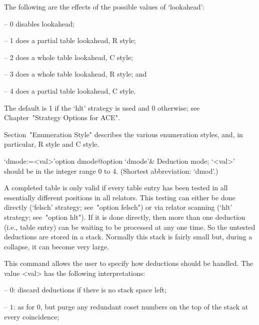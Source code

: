 The following are the effects of the possible values of `lookahead':

\beginlist

\item{--} 0 disables lookahead;
\item{--} 1 does a partial table lookahead, R style; 
\item{--} 2 does a whole table lookahead, C style; 
\item{--} 3 does a whole table lookahead, R style; and
\item{--} 4 does a partial table lookahead, C style.  

\endlist

The default is 1 if the `hlt' strategy is used and  0  otherwise;  see
Chapter~"Strategy Options for ACE".

Section~"Enumeration Style" describes the various enumeration  styles,
and, in particular, R style and C style.

\enditems


\beginitems

\>`dmode:=<val>'{option dmode}@{option `dmode'}&
Deduction mode; `<val>' should be in the integer range 0 to 4.
(Shortest abbreviation: `dmod'.)

A completed table  is only valid if every table  entry has been tested
in all essentially different  positions in all relators.  This testing
can either be done directly (`felsch' strategy;  see~"option  felsch")
or via relator scanning (`hlt' strategy; see~"option hlt"). If  it  is
done directly, then more than one deduction (i.e., table entry) can be
waiting to be processed at any one time. So  the  untested  deductions
are stored in a stack. Normally this stack is fairly small but, during
a collapse, it can become very large.

This command allows the user  to  specify  how  deductions  should  be
handled. The value <val> has the following interpretations:

\beginlist

\item{--} $0$:  
discard deductions if there is no stack space left;

\item{--} $1$: 
as for $0$, but purge any redundant coset numbers on the  top  of  the
stack at every coincidence;

